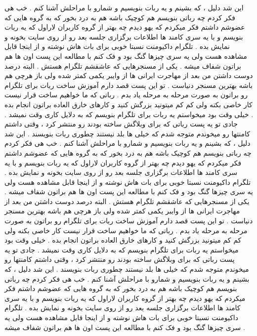 این شد دلیل ، که بشینم و یه ربات بنویسیم و شمارو با مراحلش آشنا کنم .
خب هی فکر کردم چه رباتی بنویسم هم کوچیک باشه هم به درد بخور که به گروه هایی که عضوشم داشتم فکر میکردم که یهو دیدم چه بهتر از گروه کاربران لاراول که یه ربات بنویسم و با یه سری کامند ها اطلاعات برگزاری جلسه بعد رو از روی سایت بخونه و نمایش بده .
تلگرام داکیومنت نسبتا خوبی برای بات هاش نوشته و از اینجا قابل مشاهده هست ولی یه سری چیزها گنگ بود و فک کنم با مطالعه این پست اون ها هم براتون شفاف میشه .
یکی از مسنجرهایی که عاشقشم تلگرام هستش . البته درصد دوست داشتن من بعد از مهاجرت ایرانی ها از وایبر یکمی کمتر شده ولی باز هرچی هم باشه بهترین مسنجر دنیاست .
تو این پست قصد دارم آموزش ساخت ربات برای تلگرام رو براتون به صورت مرحله به مرحله یاد بدم .
رباتی که ما خواهیم ساخت قرار نیست کار خاصی بکنه ولی کم کم میتونید بزرگش کنید و کارهای خارق العاده براتون انجام بده .
خیلی وقت بود میخواستم یه ربات برای تلگرام بنویسم که به دلایل کاری وقت نمیشد . جادی تو یه پست رباتی که برای وبلاگش ساخته بودند رو منتشر کرد ، وقتی داشتم کامنتها رو میخوندم متوجه شدم که خیلی ها بلد نیستند چطوری ربات بنویسند .
این شد دلیل ، که بشینم و یه ربات بنویسیم و شمارو با مراحلش آشنا کنم .
خب هی فکر کردم چه رباتی بنویسم هم کوچیک باشه هم به درد بخور که به گروه هایی که عضوشم داشتم فکر میکردم که یهو دیدم چه بهتر از گروه کاربران لاراول که یه ربات بنویسم و با یه سری کامند ها اطلاعات برگزاری جلسه بعد رو از روی سایت بخونه و نمایش بده .
تلگرام داکیومنت نسبتا خوبی برای بات هاش نوشته و از اینجا قابل مشاهده هست ولی یه سری چیزها گنگ بود و فک کنم با مطالعه این پست اون ها هم براتون شفاف میشه .
یکی از مسنجرهایی که عاشقشم تلگرام هستش . البته درصد دوست داشتن من بعد از مهاجرت ایرانی ها از وایبر یکمی کمتر شده ولی باز هرچی هم باشه بهترین مسنجر دنیاست .
تو این پست قصد دارم آموزش ساخت ربات برای تلگرام رو براتون به صورت مرحله به مرحله یاد بدم .
رباتی که ما خواهیم ساخت قرار نیست کار خاصی بکنه ولی کم کم میتونید بزرگش کنید و کارهای خارق العاده براتون انجام بده .
خیلی وقت بود میخواستم یه ربات برای تلگرام بنویسم که به دلایل کاری وقت نمیشد . جادی تو یه پست رباتی که برای وبلاگش ساخته بودند رو منتشر کرد ، وقتی داشتم کامنتها رو میخوندم متوجه شدم که خیلی ها بلد نیستند چطوری ربات بنویسند .
این شد دلیل ، که بشینم و یه ربات بنویسیم و شمارو با مراحلش آشنا کنم .
خب هی فکر کردم چه رباتی بنویسم هم کوچیک باشه هم به درد بخور که به گروه هایی که عضوشم داشتم فکر میکردم که یهو دیدم چه بهتر از گروه کاربران لاراول که یه ربات بنویسم و با یه سری کامند ها اطلاعات برگزاری جلسه بعد رو از روی سایت بخونه و نمایش بده .
تلگرام داکیومنت نسبتا خوبی برای بات هاش نوشته و از اینجا قابل مشاهده هست ولی یه سری چیزها گنگ بود و فک کنم با مطالعه این پست اون ها هم براتون شفاف میشه .

